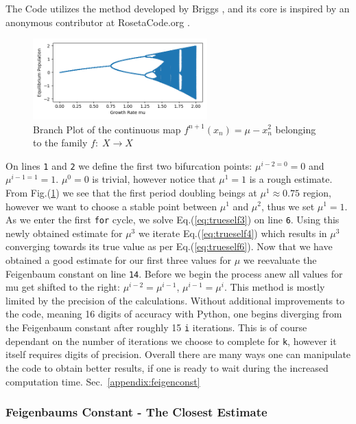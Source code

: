 The Code utilizes the method developed by Briggs \cite{briggspc}, and its core is inspired by an anonymous contributor at
RosetaCode.org \cite{rosetacode}.\\

\begin{figure}[h]
    \centering
    \includegraphics[width=0.6\textwidth]{Images/feigen5.png}
    \caption{Branch Plot of the continuous map $f^{n+1}(x_n) = \mu - x_n^2$ belonging to the family $f:\; X\to X$}
    \label{fig:feigen5}
\end{figure}

On lines \texttt{1} and \texttt{2} we define the first two bifurcation points: $\mu^{i-2 = 0} = 0$ and $\mu^{i-1 = 1} = 1$.
$\mu^{0} = 0$ is trivial, however notice that $\mu^{1} = 1$ is a rough estimate. From Fig.(\ref{fig:feigen5}) we see
that the first period doubling beings at $\mu^1 \approx 0.75$ region, however we want to choose a stable point between
$\mu^{1}$ and $\mu^{2}$, thus we set $\mu^{1} = 1$.\\
As we enter the first \texttt{for} cycle, we solve Eq.(\ref{eq:trueself3}) on line \texttt{6}. Using this newly obtained
estimate for $\mu^3$ we iterate Eq.(\ref{eq:trueself4}) which results in $\mu^3$ converging towards its true value as
per Eq.(\ref{eq:trueself6}). Now that we have obtained a good estimate for our first three values for $\mu$ we reevaluate
the Feigenbaum constant on line \texttt{14}. Before we begin the process anew all values for mu get shifted to the right:
$\mu^{i-2} = \mu^{i-1}$, $\mu^{i-1} = \mu^{i}$. This method is mostly limited by the precision of the calculations. Without
additional improvements to the code, meaning 16 digits of accuracy with Python, one begins diverging from the Feigenbaum
constant after roughly 15 \texttt{i} iterations. This is of course dependant on the number of iterations we choose to 
complete for \texttt{k}, however it itself requires digits of precision. Overall there are many ways one can manipulate the
code to obtain better results, if one is ready to wait during the increased computation time. Sec.~\ref{appendix:feigenconst}

\subsubsection{Feigenbaums Constant - The Closest Estimate}

